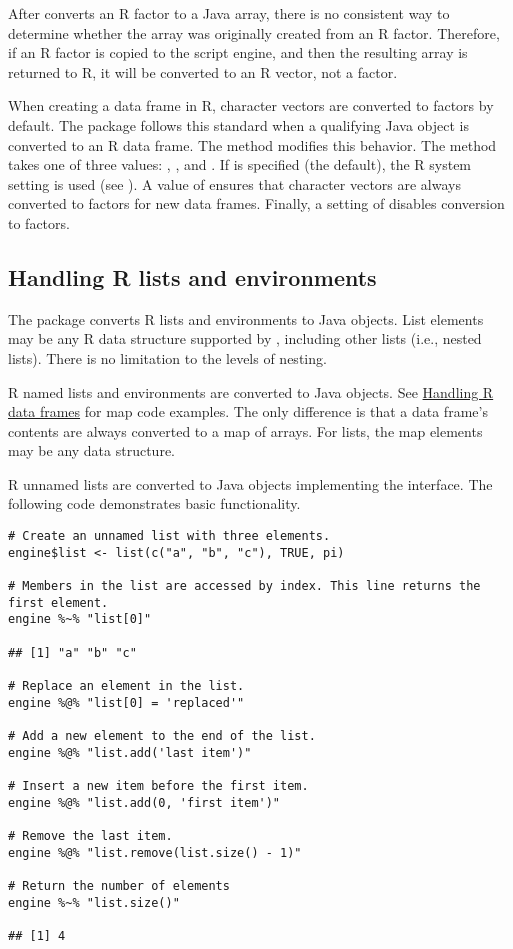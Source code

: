 After  converts an R factor to a Java array, there is no consistent way to determine whether the array was originally created from an R factor. Therefore, if an R factor is copied to the script engine, and then the resulting array is returned to R, it will be converted to an R vector, not a factor.

When creating a data frame in R, character vectors are converted to factors by default. The  package follows this standard when a qualifying Java object is converted to an R data frame. The  method modifies this behavior. The method takes one of three values: , , and . If  is specified (the default), the R system setting is used (see \newline{}). A value of  ensures that character vectors are always converted to factors for new data frames. Finally, a setting of  disables conversion to factors.

\subsection{Handling R lists and environments}
The  package converts R lists and environments to Java objects. List elements may be any R data structure supported by , including other lists (i.e., nested lists). There is no limitation to the levels of nesting.

R named lists and environments are converted to Java \href{https://docs.oracle.com/javase/8/docs/api/java/util/HashMap.html}{} objects. See \hyperlink{handlingrdataframes}{Handling R data frames} for map code examples. The only difference is that a data frame's contents are always converted to a map of arrays. For lists, the map elements may be any data structure.

R unnamed lists are converted to Java objects implementing the \href{https://docs.oracle.com/javase/8/docs/api/java/util/ArrayList.html}{} interface. The following code demonstrates basic  functionality.

\begin{verbatim}
# Create an unnamed list with three elements.
engine$list <- list(c("a", "b", "c"), TRUE, pi)

# Members in the list are accessed by index. This line returns the first element.
engine %~% "list[0]"

## [1] "a" "b" "c"

# Replace an element in the list.
engine %@% "list[0] = 'replaced'"

# Add a new element to the end of the list.
engine %@% "list.add('last item')"

# Insert a new item before the first item.
engine %@% "list.add(0, 'first item')"

# Remove the last item.
engine %@% "list.remove(list.size() - 1)"

# Return the number of elements
engine %~% "list.size()"

## [1] 4
\end{verbatim}

